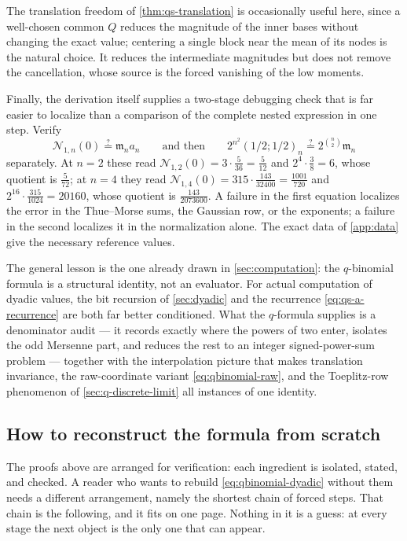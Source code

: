 \documentclass[11pt,oneside]{article}
\theoremstyle{definition}
\theoremstyle{remark}
\begin{document}
The translation freedom of \cref{thm:qs-translation} is occasionally useful here, since a
well-chosen common $Q$ reduces the magnitude of the inner bases without changing the exact
value; centering a single block near the mean of its nodes is the natural choice.  It reduces
the intermediate magnitudes but does not remove the cancellation, whose source is the forced
vanishing of the low moments.

Finally, the derivation itself supplies a two-stage debugging check that is far easier to
localize than a comparison of the complete nested expression in one step.  Verify
\begin{equation}
 \mathcal N_{1,n}(0)\overset{?}{=}\mathfrak m_na_n
 \qquad\text{and then}\qquad
 2^{n^2}(1/2;1/2)_n\overset{?}{=}2^{\binom n2}\mathfrak m_n \label{eq:qs-two-stage-check}
\end{equation}
separately.  At $n=2$ these read $\mathcal N_{1,2}(0)=3\cdot\tfrac5{36}=\tfrac5{12}$ and
$2^{4}\cdot\tfrac38=6$, whose quotient is $\tfrac5{72}$; at $n=4$ they read
$\mathcal N_{1,4}(0)=315\cdot\tfrac{143}{32400}=\tfrac{1001}{720}$ and
$2^{16}\cdot\tfrac{315}{1024}=20160$, whose quotient is $\tfrac{143}{2073600}$.  A failure in
the first equation localizes the error in the Thue--Morse sums, the Gaussian row, or the
exponents; a failure in the second localizes it in the normalization alone.  The exact data of
\cref{app:data} give the necessary reference values.

The general lesson is the one already drawn in \cref{sec:computation}: the $q$-binomial
formula is a structural identity, not an evaluator.  For actual computation of dyadic values,
the bit recursion of \cref{sec:dyadic} and the recurrence \eqref{eq:qs-a-recurrence} are both
far better conditioned.  What the $q$-formula supplies is a denominator audit --- it records
exactly where the powers of two enter, isolates the odd Mersenne part, and reduces the rest to
an integer signed-power-sum problem --- together with the interpolation picture that makes
translation invariance, the raw-coordinate variant \eqref{eq:qbinomial-raw}, and the
Toeplitz-row phenomenon of \cref{sec:q-discrete-limit} all instances of one identity.

\subsection{How to reconstruct the formula from scratch}
\label{subsec:blu-blueprint}

The proofs above are arranged for verification: each ingredient is isolated, stated, and
checked.  A reader who wants to rebuild \eqref{eq:qbinomial-dyadic} without them needs a
different arrangement, namely the shortest chain of forced steps.  That chain is the
following, and it fits on one page.  Nothing in it is a guess: at every stage the next
object is the only one that can appear.
\end{document}
